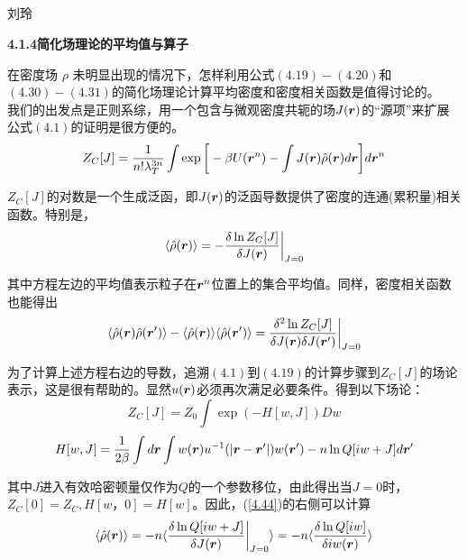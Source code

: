 \subsection{ }

\begin{center}
刘玲
\end{center}

\textbf{4.1.4简化场理论的平均值与算子}

在密度场 $\rho $ 未明显出现的情况下，怎样利用公式$(4.19)-(4.20)$和$(4.30)-(4.31)$的简化场理论计算平均密度和密度相关函数是值得讨论的。\\

我们的出发点是正则系综，用一个包含与微观密度共轭的场$J(\bm{r})$的“源项”来扩展公式$(4.1)$的证明是很方便的。\\
\begin{equation}
Z_{C}[J]=\frac{1}{n! \lambda _{T}^{3n}} \int  \exp \bigg[-\beta U(\bm{r}^{n})- \int J(\bm{r}) \hat{ \rho }(\bm{r})d\bm{r} \bigg] d \bm{r}^{n}
\end{equation}

$Z_{C}[J]$的对数是一个生成泛函，即$J(\bm{r})$的泛函导数提供了密度的连通(累积量)相关函数。特别是，\\
\begin{equation}
\langle \hat{ \rho } (\bm{r}) \rangle = - \frac{\delta \ln Z_{C}[J] }{\delta J(\bm{r})} \bigg |_{J=0}
\end{equation}

其中方程左边的平均值表示粒子在$\bm{r}^{n}$位置上的集合平均值。同样，密度相关函数也能得出\\
\begin{equation}
\langle \hat{ \rho } (\bm{r}) \hat{ \rho } (\bm{r}')\rangle - \langle  \hat{ \rho } (\bm{r}) \rangle \langle  \hat{ \rho } (\bm{r}') \rangle = \frac{\delta ^{2} \ln Z_{C}[J]}{\delta J(\bm{r}) \delta J(\bm{r}')} \bigg |_{J=0}
\label{4.44}
\end{equation}

为了计算上述方程右边的导数，追溯$(4.1)$到$(4.19)$的计算步骤到$Z_{C}[J]$的场论表示，这是很有帮助的。显然$u(\bm{r})$必须再次满足必要条件。得到以下场论：\\
\begin{equation}
Z_{C}[J]=Z_{0} \int \exp (-H[w,J]) D w 
\end{equation}
\begin{equation}
H[w ,J]=\frac{1}{2 \beta } \int d\bm{r} \int w (\bm{r}) u^{-1} (|\bm{r}-\bm{r}'|) w (\bm{r}') - n \ln Q[i w +J] d\bm{r}'
\end{equation}

其中$J$进入有效哈密顿量仅作为$Q$的一个参数移位，由此得出当$J=0$时，$Z_{C}[0]=Z_{C},H[ w，0]=H[ w ]$。因此，(\ref{4.44})的右侧可以计算\\
\begin{equation}
\langle \hat{ \rho } (\bm{r}) \rangle = - n \langle \frac{ \delta \ln Q[i w + J ]}{ \delta J(\bm{r}) } \bigg|_{J=0} \rangle = -n \langle \frac{\delta \ln Q[ i w]}{ \delta i w (\bm{r})} \rangle
\label{4.48}
\end{equation}

